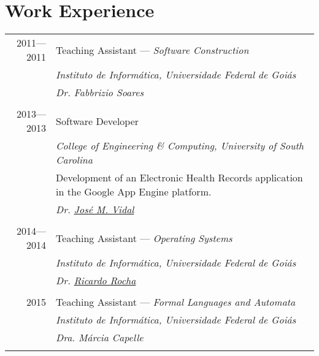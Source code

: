 \documentclass[a4paper,10pt]{article}
\begin{document}
\section{Work Experience}
\begin{tabular}{r|p{11cm}}

  \textsc{2011---2011}
  & Teaching Assistant --- \emph{Software Construction}\\
  &\emph{Instituto de Informática, Universidade Federal de Goiás}\\
  &\emph{Dr. Fabbrizio Soares}
  \\\multicolumn{2}{c}{} \\

  \textsc{2013---2013}
  & Software Developer\\
  &\emph{College of Engineering \& Computing, University of South Carolina}\\
  &\footnotesize{Development of an Electronic Health Records application in the Google App Engine platform.}\\
  &\emph{Dr. \href{http://jmvidal.cse.sc.edu}{José M. Vidal}}
  \\\multicolumn{2}{c}{} \\

  \textsc{2014---2014}
  & Teaching Assistant --- \emph{Operating Systems}\\
  &\emph{Instituto de Informática, Universidade Federal de Goiás}\\
  &\emph{Dr. \href{http://inf.ufg.br/~ricardo/}{Ricardo Rocha}}
  \\\multicolumn{2}{c}{} \\

  \textsc{2015}
  & Teaching Assistant --- \emph{Formal Languages and Automata}\\
  &\emph{Instituto de Informática, Universidade Federal de Goiás}\\
  &\emph{Dra. {Márcia Capelle}}
  \\\multicolumn{2}{c}{} \\


\end{tabular}

\end{document}
